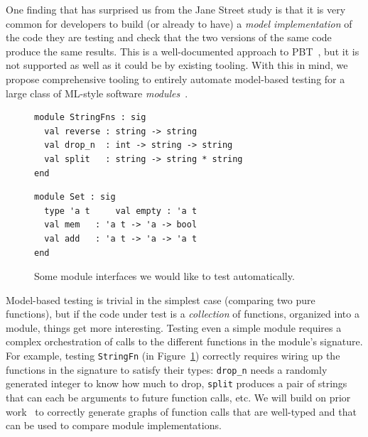 One finding that has surprised us from the Jane Street study is that
it is {very} common for developers to build (or already to have) a
{\em model
implementation} of the code they are testing and check that the two versions of
the same code produce the same results.  This is a well-documented approach to
PBT~\cite{hughes_experiences_2016}, but it is not supported as well as it could
be by existing tooling.
%
With this in mind, we propose comprehensive tooling to entirely automate
model-based testing for a large class of ML-style software
{\em modules}~\cite{macqueen_modules_1984}.

\begin{figure}[t]
  \begin{minipage}{.45\textwidth}
\begin{lstlisting}
module StringFns : sig
  val reverse : string -> string
  val drop_n  : int -> string -> string
  val split   : string -> string * string
end
\end{lstlisting}
  \end{minipage}
  \qquad\qquad
  \begin{minipage}{.45\textwidth}
\begin{lstlisting}
module Set : sig
  type 'a t     val empty : 'a t
  val mem   : 'a t -> 'a -> bool
  val add   : 'a t -> 'a -> 'a t
end
\end{lstlisting}
  \end{minipage}
  \caption{Some module interfaces we would like to test
    automatically.}\label{fig:sigs}
\end{figure}

Model-based testing is trivial in the simplest case (comparing two pure
functions), but if the code under test is a {\em collection} of functions,
organized into a module, things get more interesting. Testing even a simple
module requires a complex orchestration of calls to the different functions in
the module's signature. For example, testing \lstinline{StringFn} (in
Figure~\ref{fig:sigs}) correctly requires wiring up the functions in the
signature to satisfy their types: \lstinline{drop_n} needs a randomly generated
integer to know how much to drop, \lstinline{split} produces a pair of strings
that can each be arguments to future function calls, etc. We will build on prior
work~\cite{hughes_experiences_2016} to correctly generate graphs of function
calls that are well-typed and that can be used to compare module implementations.

